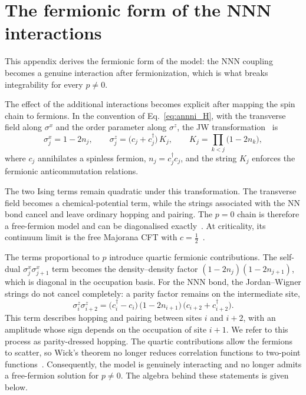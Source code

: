 \FloatBarrier
\section{The fermionic form of the NNN interactions}
\label{app:pairing}
\label{sec:annni:jw}

This appendix derives the fermionic form of the model: the \ac{NNN} coupling becomes a genuine interaction after fermionization, which is what breaks integrability for every $p\neq0$.


The effect of the additional interactions becomes explicit after mapping the spin chain to fermions. In the convention of Eq.~\eqref{eq:annni_H}, with the transverse field along $\sigma^x$ and the order parameter along $\sigma^z$, the \ac{JW} transformation~\cite{jordan_wigner1928,fradkin2013} is
\begin{equation}
    \sigma^x_j = 1 - 2n_j, \qquad
    \sigma^z_j = \big(c_j + c_j^\dagger\big)\,K_j, \qquad
    K_j = \prod_{k<j}\big(1-2n_k\big),
    \label{eq:annni:jwmap}
\end{equation}
where $c_j$ annihilates a spinless fermion, $n_j=c^\dagger_j c_j$, and the string $K_j$ enforces the fermionic anticommutation relations.

The two Ising terms remain quadratic under this transformation. The transverse field becomes a chemical-potential term, while the strings associated with the \ac{NN} bond cancel and leave ordinary hopping and pairing. The $p=0$ chain is therefore a free-fermion model and can be diagonalised exactly~\cite{pfeuty1970}. At criticality, its continuum limit is the free Majorana \ac{CFT} with $c=\tfrac12$~\cite{difrancesco1997}.

The terms proportional to $p$ introduce quartic fermionic contributions. The self-dual $\sigma^x_j\sigma^x_{j+1}$ term becomes the density--density factor $(1-2n_j)(1-2n_{j+1})$, which is diagonal in the occupation basis. For the \ac{NNN} bond, the Jordan--Wigner strings do not cancel completely: a parity factor remains on the intermediate site,
\begin{equation}
    \sigma^z_i \sigma^z_{i+2}
    = \big(c_i^\dagger - c_i\big)\,\big(1-2n_{i+1}\big)\,\big(c_{i+2}+c_{i+2}^\dagger\big).
    \label{eq:annni:hop}
\end{equation}
This term describes hopping and pairing between sites $i$ and $i+2$, with an amplitude whose sign depends on the occupation of site $i+1$. We refer to this process as parity-dressed hopping. The quartic contributions allow the fermions to scatter, so Wick's theorem no longer reduces correlation functions to two-point functions~\cite{wick1950}. Consequently, the model is genuinely interacting and no longer admits a free-fermion solution for $p\neq0$. The algebra behind these statements is given below.

